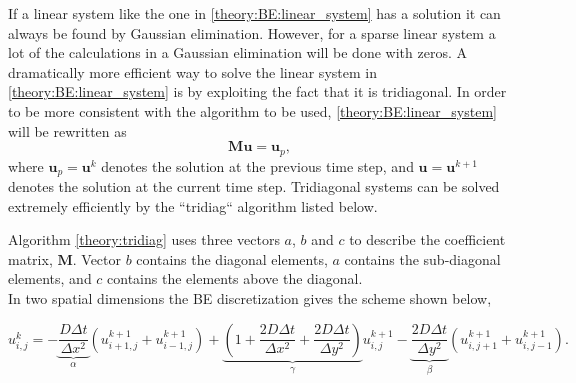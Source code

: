 \noindent If a linear system like the one in \eqref{theory:BE:linear_system} has a solution it can always be found by Gaussian elimination. 
However, for a sparse linear system a lot of the calculations in a Gaussian elimination will be done with zeros. 
A dramatically more efficient way to solve the linear system in \eqref{theory:BE:linear_system} is by exploiting the fact that it is tridiagonal. 
In order to be more consistent with the algorithm to be used, \eqref{theory:BE:linear_system} will be rewritten as
\begin{equation}
  \mathbf{M}\mathbf{u} = \mathbf{u}_p,
\end{equation}
where $\mathbf{u}_p = \mathbf{u}^{k}$ denotes the solution at the previous time step, and $\mathbf{u} =\mathbf{u}^{k+1}$ denotes the solution at the current time step. 
Tridiagonal systems can be solved extremely efficiently by the ``tridiag`` algorithm listed below. 

{

 }

\noindent Algorithm \ref{theory:tridiag} uses three vectors $a$, $b$ and $c$ to describe the coefficient matrix, $\mathbf{M}$. Vector $b$ contains the diagonal elements, $a$ contains the sub-diagonal elements, and $c$ contains the elements above the diagonal. \\

In two spatial dimensions the BE discretization gives the scheme shown below,

\begin{equation}\label{general_scheme_BE2D}
 u^{k}_{i,j} = -\underbrace{\frac{D\Delta t}{\Delta x^2}}_{\alpha}\left(u^{k+1}_{i+1,j}+u^{k+1}_{i-1,j}\right) +
 \underbrace{\left(1+\frac{2D\Delta t}{\Delta x^2} +\frac{2D\Delta t}{\Delta y^2}\right)}_{\gamma}u^{k+1}_{i,j} 
 -\underbrace{\frac{2D\Delta t}{\Delta y^2}}_{\beta}\left(u^{k+1}_{i,j+1}+u^{k+1}_{i,j-1}\right).
\end{equation}

